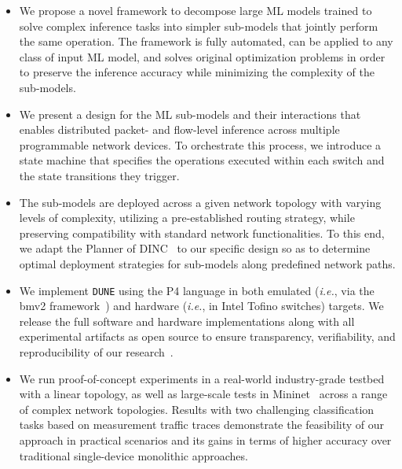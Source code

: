 \documentclass[journal]{IEEEtran}
\theoremstyle{plain} %
\newcommand{\ie}{\textit{i.e.},\xspace}
\newcommand{\td}[1]{\textcolor{red}{[TODO: #1]}}
\newcommand{\name}{\texttt{\fontsize{9}{11}\selectfont DUNE}\xspace}
\begin{document}
\begin{itemize}
    \item We propose a novel framework to decompose large ML models trained to solve complex inference tasks into simpler sub-models that jointly perform the same operation. The framework is fully automated, can be applied to any class of input ML model, and solves original optimization problems in order to preserve the inference accuracy while minimizing the complexity of the sub-models.
    \item We present a design for the ML sub-models and their interactions that enables distributed packet- and flow-level inference across multiple programmable network devices. To orchestrate this process, we introduce a state machine that specifies the operations executed within each switch and the state transitions they trigger.
    \item The sub-models are deployed across a given network topology with varying levels of complexity, utilizing a pre-established routing strategy, while preserving compatibility with standard network functionalities. To this end, we adapt the Planner of DINC~\cite{dinc-conext23} to our specific design so as to determine optimal deployment strategies for sub-models along predefined network paths.
    \item We implement \name using the P4 language in both emulated (\ie via the bmv2 framework~\cite{bmv2}) and hardware (\ie in Intel Tofino switches) targets. We release the full software and hardware implementations along with all experimental artifacts as open source to ensure transparency, verifiability, and reproducibility of our research~\cite{code-dune}.
    \item We run proof-of-concept experiments in a real-world industry-grade testbed with a linear topology, as well as large-scale tests in Mininet~\cite{team2017mininet} across a range of complex network topologies. Results with two challenging classification tasks based on measurement traffic traces demonstrate the feasibility of our approach in practical scenarios and its gains in terms of higher accuracy over traditional single-device monolithic approaches.
\end{itemize}
\end{document}
